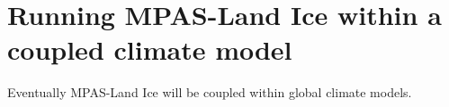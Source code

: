 \chapter{Running MPAS-Land Ice within a coupled climate model}
\label{chap:climatemodel_landice_coupling}

Eventually MPAS-Land Ice will be coupled within global climate models.
